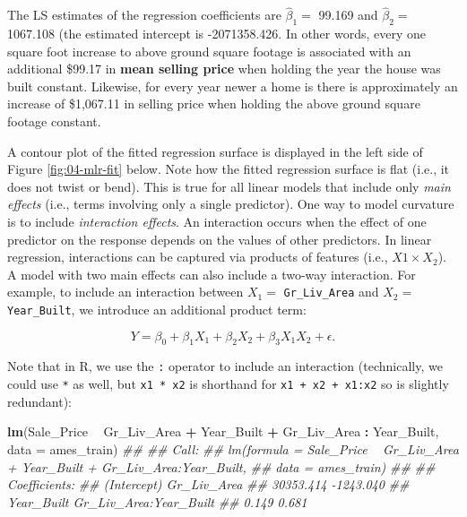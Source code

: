 \documentclass[]{krantz}
\makeatletter
\newenvironment{Shaded}{\begin{snugshade}}{\end{snugshade}}
\newcommand{\CommentTok}[1]{\textcolor[rgb]{0.37,0.37,0.37}{\textit{#1}}}
\newcommand{\DataTypeTok}[1]{\textcolor[rgb]{0.27,0.27,0.27}{#1}}
\newcommand{\KeywordTok}[1]{\textcolor[rgb]{0.27,0.27,0.27}{\textbf{#1}}}
\newcommand{\NormalTok}[1]{#1}
\newcommand{\OperatorTok}[1]{\textcolor[rgb]{0.43,0.43,0.43}{\textbf{#1}}}
\newcommand{\StringTok}[1]{\textcolor[rgb]{0.5,0.5,0.5}{#1}}
\newenvironment{kframe}{%
\medskip{}
\setlength{\fboxsep}{.8em}
 \def\at@end@of@kframe{}%
 \ifinner\ifhmode%
  \def\at@end@of@kframe{\end{minipage}}%
  \begin{minipage}{\columnwidth}%
 \fi\fi%
 \def\FrameCommand##1{\hskip\@totalleftmargin \hskip-\fboxsep
 \colorbox{shadecolor}{##1}\hskip-\fboxsep
     \hskip-\linewidth \hskip-\@totalleftmargin \hskip\columnwidth}%
 \MakeFramed {\advance\hsize-\width
   \@totalleftmargin\z@ \linewidth\hsize
   \@setminipage}}%
 {\par\unskip\endMakeFramed%
 \at@end@of@kframe}
\renewenvironment{Shaded}{\begin{kframe}}{\end{kframe}}
\makeatother
\begin{document}
The LS estimates of the regression coefficients are \(\widehat{\beta}_1 =\) 99.169 and \(\widehat{\beta}_2 =\) 1067.108 (the estimated intercept is -2071358.426. In other words, every one square foot increase to above ground square footage is associated with an additional \$99.17 in \textbf{mean selling price} when holding the year the house was built constant. Likewise, for every year newer a home is there is approximately an increase of \$1,067.11 in selling price when holding the above ground square footage constant.

A contour plot of the fitted regression surface is displayed in the left side of Figure \ref{fig:04-mlr-fit} below. Note how the fitted regression surface is flat (i.e., it does not twist or bend). This is true for all linear models that include only \emph{main effects} (i.e., terms involving only a single predictor). One way to model curvature is to include \emph{interaction effects}. An interaction occurs when the effect of one predictor on the response depends on the values of other predictors. In linear regression, interactions can be captured via products of features (i.e., \(X1 \times X_2\)). A model with two main effects can also include a two-way interaction. For example, to include an interaction between \(X_1 =\) \texttt{Gr\_Liv\_Area} and \(X_2 =\) \texttt{Year\_Built}, we introduce an additional product term:

\begin{equation}
  Y = \beta_0 + \beta_1 X_1 + \beta_2 X_2 + \beta_3 X_1 X_2 + \epsilon.
\end{equation}

Note that in R, we use the \texttt{:} operator to include an interaction (technically, we could use \texttt{*} as well, but \texttt{x1\ *\ x2} is shorthand for \texttt{x1\ +\ x2\ +\ x1:x2} so is slightly redundant):

\begin{Shaded}
\begin{Highlighting}[]
\KeywordTok{lm}\NormalTok{(Sale_Price }\OperatorTok{~}\StringTok{ }\NormalTok{Gr_Liv_Area }\OperatorTok{+}\StringTok{ }\NormalTok{Year_Built }\OperatorTok{+}\StringTok{ }\NormalTok{Gr_Liv_Area }\OperatorTok{:}\StringTok{ }\NormalTok{Year_Built, }
   \DataTypeTok{data =}\NormalTok{ ames_train)}
\CommentTok{## }
\CommentTok{## Call:}
\CommentTok{## lm(formula = Sale_Price ~ Gr_Liv_Area + Year_Built + Gr_Liv_Area:Year_Built, }
\CommentTok{##     data = ames_train)}
\CommentTok{## }
\CommentTok{## Coefficients:}
\CommentTok{##            (Intercept)             Gr_Liv_Area  }
\CommentTok{##              30353.414               -1243.040  }
\CommentTok{##             Year_Built  Gr_Liv_Area:Year_Built  }
\CommentTok{##                  0.149                   0.681}
\end{Highlighting}
\end{Shaded}
\end{document}
